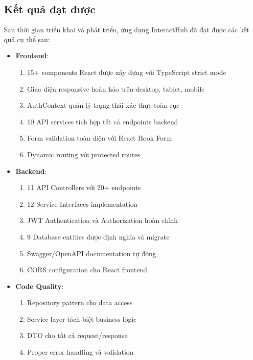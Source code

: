 \documentclass[a4paper]{article}
\begin{document}
    \subsection{Kết quả đạt được}
    Sau thời gian triển khai và phát triển, ứng dụng InteractHub đã đạt được các kết quả cụ thể sau:
    \begin{itemize}
        \item \textbf{Frontend}: 
        \begin{enumerate}
            \item 15+ components React được xây dựng với TypeScript strict mode
            \item Giao diện responsive hoàn hảo trên desktop, tablet, mobile
            \item AuthContext quản lý trạng thái xác thực toàn cục
            \item 10 API services tích hợp tất cả endpoints backend
            \item Form validation toàn diện với React Hook Form
            \item Dynamic routing với protected routes
        \end{enumerate}
        \item \textbf{Backend}: 
        \begin{enumerate}
            \item 11 API Controllers với 20+ endpoints
            \item 12 Service Interfaces implementation
            \item JWT Authentication và Authorization hoàn chỉnh
            \item 9 Database entities được định nghĩa và migrate
            \item Swagger/OpenAPI documentation tự động
            \item CORS configuration cho React frontend
        \end{enumerate}
        \item \textbf{Code Quality}: 
        \begin{enumerate}
            \item Repository pattern cho data access
            \item Service layer tách biệt business logic
            \item DTO cho tất cả request/response
            \item Proper error handling và validation
        \end{enumerate}
    \end{itemize}
\end{document}
